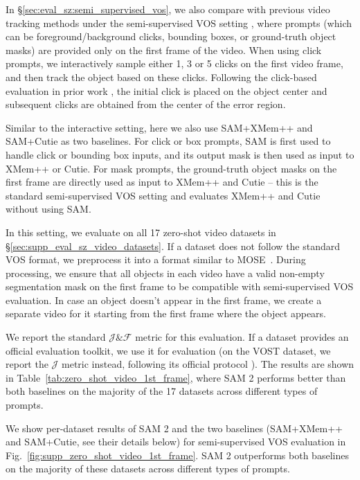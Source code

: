 \documentclass[]{fairmeta}
\newcommand{\figref}[1]{Fig.~\ref{#1}}
\newcommand{\secref}[1]{\S\ref{#1}}
\newcommand{\tabref}[1]{Table~\ref{#1}}
\begin{document}
In \secref{sec:eval_sz:semi_supervised_vos}, we also compare with previous video tracking methods under the semi-supervised VOS setting \citep{Pont-Tuset_arXiv_2017}, where prompts (which can be foreground/background clicks, bounding boxes, or ground-truth object masks) are provided only on the first frame of the video. When using click prompts, we interactively sample either 1, 3 or 5 clicks on the first video frame, and then track the object based on these clicks. Following the click-based evaluation in prior work \citep{kirillov2023segment,ritm}, the initial click is placed on the object center and subsequent clicks are obtained from the center of the error region.

Similar to the interactive setting, here we also use SAM+XMem++ and SAM+Cutie as two baselines. For click or box prompts, SAM is first used to handle click or bounding box inputs, and its output mask is then used as input to XMem++ or Cutie. For mask prompts, the ground-truth object masks on the first frame are directly used as input to XMem++ and Cutie -- this is the standard semi-supervised VOS setting and evaluates XMem++ and Cutie without using SAM.

In this setting, we evaluate on all 17 zero-shot video datasets in \secref{sec:supp_eval_sz_video_datasets}. If a dataset does not follow the standard VOS format, we preprocess it into a format similar to MOSE~\citep{Ding2023MOSEAN}. During processing, we ensure that all objects in each video have a valid non-empty segmentation mask on the first frame to be compatible with semi-supervised VOS evaluation. In case an object doesn't appear in the first frame, we create a separate video for it starting from the first frame where the object appears.

We report the standard $\mathcal{J}\&\mathcal{F}$ metric \citep{Pont-Tuset_arXiv_2017} for this evaluation. If a dataset provides an official evaluation toolkit, we use it for evaluation (on the VOST dataset, we report the $\mathcal{J}$ metric instead, following its official protocol \citep{Tokmakov2022BreakingT}). The results are shown in \tabref{tab:zero_shot_video_1st_frame}, where SAM 2 performs better than both baselines on the majority of the 17 datasets across different types of prompts.

We show per-dataset results of SAM 2 and the two baselines (SAM+XMem++ and SAM+Cutie, see their details below) for semi-supervised VOS evaluation in \figref{fig:supp_zero_shot_video_1st_frame}. SAM 2 outperforms both baselines on the majority of these datasets across different types of prompts.
\end{document}
